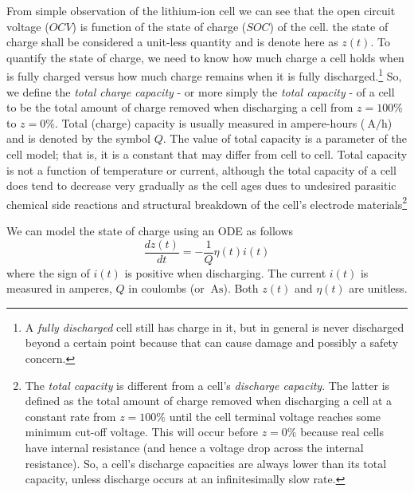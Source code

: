 \documentclass[12pt,a4paper]{scrartcl}
\begin{document}
\begin{onehalfspace}
From simple observation of the lithium-ion cell we can see that the open circuit voltage ($OCV$) is function of the state of charge ($SOC$) of the cell. the state of charge shall be considered a unit-less quantity and is denote here as $z(t)$. To quantify the state of charge, we need to know how much charge a cell holds when is fully charged versus how much charge remains when it is fully discharged.\footnote{A \textit{fully discharged} cell still has charge in it, but in general is never discharged beyond a certain point because that can cause damage and possibly a safety concern.} So, we define the \textit{total charge capacity} - or more simply the \textit{total capacity} - of a cell to be the total amount of charge removed when discharging a cell from $z=100\%$ to $z=0\%$. Total (charge) capacity is usually measured in ampere-hours ($\SI{}{\ampere\per\hour}$) and is denoted by the symbol $Q$. The value of total capacity is a parameter of the cell model; that is, it is a constant that may differ from cell to cell. Total capacity is not a function of temperature or current, although the total capacity of a cell does tend to decrease very gradually as the cell ages dues to undesired parasitic chemical side reactions and structural breakdown of the cell's electrode materials\footnote{The \textit{total capacity} is different from a cell's \textit{discharge capacity}. The latter is defined as the total amount of charge removed when discharging a cell at a constant rate from $z=100\%$ until the cell terminal voltage reaches some minimum cut-off voltage. This will occur before $z=0\%$ because real cells have internal resistance (and hence a voltage drop across the internal resistance). So, a cell's discharge capacities are always lower than its total capacity, unless discharge occurs at an infinitesimally slow rate.}

We can model the state of charge using an ODE as follows
\begin{equation}
	\frac{dz(t)}{dt} = -\frac{1}{Q}\eta(t)i(t)
\end{equation}
where the sign of $i(t)$ is positive when discharging. The current $i(t)$ is measured in amperes, $Q$ in coulombs (or $\SI{}{\ampere\second}$). Both $z(t)$ and $\eta(t)$ are unitless.


\end{onehalfspace}
\end{document}
